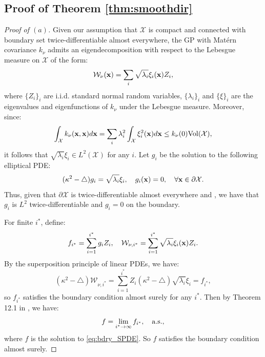 \documentclass[aos,preprint]{imsart}
\theoremstyle{plain}
\newcommand{\CalX}{\mathcal X}
\newcommand{\Bx}{\bold x}
\newcommand{\BFx}{\bold x}
\newcommand{\CalW}{\mathcal{W}}
\theoremstyle{remark}
\begin{document}
\begin{appendix}
\stitle{}


\section{Proof of Theorem \ref{thm:smoothdir}}
\label{pf:smoothdir}
\begin{proof}[Proof of ${(a)}$]
Given our assumption that $\CalX$ is compact and connected with boundary set twice-differentiable almost everywhere, the GP with Mat\'ern covariance $k_{\nu}$ admits an eigendecomposition with respect to the Lebesgue measure on $\CalX$ of the form:
\begin{equation}
    \label{eq:smoothdir_pf_1}
    \CalW_\nu(\BFx)=\sum_i \sqrt{\lambda_i}\xi_i(\BFx)Z_i,
\end{equation}
where $\{Z_i\}_i$ are i.i.d. standard normal random variables, $\{\lambda_i\}_i$ and $\{\xi\}_i$ are the eigenvalues and eigenfunctions of $k_{\nu}$ under the Lebesgue measure. Moreover, since:
\[\int_\CalX k_\nu(\Bx,\Bx)d\Bx=\sum_i\lambda_i^2\int_\CalX\xi^2_i(\Bx)d\Bx\leq k_\nu(0) {\rm Vol}(\CalX),\]
it follows that $\sqrt{\lambda_i}\xi_i\in L^2(\CalX)$ for any $i$. Let $g_i$ be the solution to the following elliptical PDE:
\begin{equation}
    \label{eq:smoothdir_pf_2}
    (\kappa^2-\bigtriangleup)g_i=\sqrt{\lambda_i}\xi_i,  \quad g_i(\BFx)=0, \quad \forall\BFx \in\partial \CalX.
\end{equation}
Thus, given that $\partial \mathcal{X}$ is twice-differentiable almost everywhere and \cite[Theorem 4, Chapter 6]{Evans15}, we have that $g_i$ is $L^2$ twice-differentiable and $g_i=0$ on the boundary.

For finite $i^*$, define:
\[f_{i^*}=\sum_{i=1}^{i^*} g_iZ_i,\quad \CalW_{\nu,i^*}= \sum_{i=1}^{i^*} \sqrt{\lambda_i}\xi_i(\BFx)Z_i.\]
By the superposition principle of linear PDEs, we have:
\[   (\kappa^2-\bigtriangleup)\CalW_{\nu,i^*}=\sum_{i=1}^{i^*} Z_i   (\kappa^2-\bigtriangleup)\sqrt{\lambda_i}\xi_i=f_{i^*},\]
so $f_{i^*}$ satisfies the boundary condition almost surely for any $i^*$. Then by Theorem 12.1 in \cite{lifshits2012lectures}, we have:
\[f=\lim_{i^*\to\infty}f_{i^*},\quad {\rm a.s.,}\]
where $f$ is the solution to \eqref{eq:bdry_SPDE}. So $f$ satisfies the boundary condition almost surely.
\end{proof}


\end{appendix}
\end{document}
